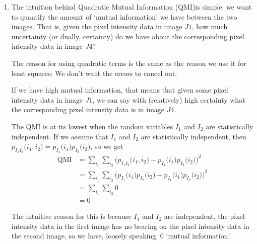 \documentclass[a4paper]{article}
\begin{document}
\begin{enumerate}[label=(\alph*)]
\item The intuition behind Quadratic Mutual Information (QMI)is simple: we want to quantify the amount of `mutual information' we have between the two images. That is, given the pixel intensity data in image $J1$, how much uncertainty (or dually, certainty) do we have about the corresponding pixel intensity data in image $J4$?

The reason for using quadratic terms is the same as the reason we use it for least squares: We don't want the errors to cancel out.

If we have high mutual information, that means that given some pixel intensity data in image $J1$, we can say with (relatively) high certainty what the corresponding pixel intensity data is in image $J4$.

The QMI is at its lowest when the random variables $I_1$ and $I_2$ are statistically independent. If we assume that $I_1$ and $I_2$ are statistically independent, then $p_{I_1 I_2}\big( i_1, i_2\big) = p_{I_1}\big( i_1\big)p_{I_2}\big( i_2\big)$, so we get
\begin{align*}
\text{QMI} &= \sum\limits_{i_1} \sum\limits_{i_2} \Big( p_{I_1 I_2}\big( i_1, i_2\big) - p_{I_1}\big( i_1\big)p_{I_2}\big( i_2\big) \Big)^2 \nonumber \\
&= \sum\limits_{i_1} \sum\limits_{i_2} \Big( p_{I_1}\big( i_1\big)p_{I_2}\big( i_2\big) - p_{I_1}\big( i_1\big)p_{I_2}\big( i_2\big) \Big)^2 \\
&= \sum\limits_{i_1} \sum\limits_{i_2} 0 \\
&= 0
\end{align*}

The intuitive reason for this is because $I_1$ and $I_2$ are independent, the pixel intensity data in the first image has no bearing on the pixel intensity data in the second image, so we have, loosely speaking, 0 `mutual information'.
\end{enumerate}
\end{document}
